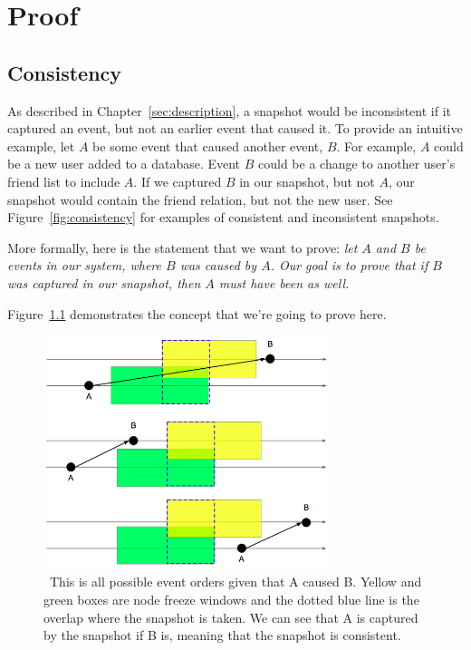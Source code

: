 \chapter{Proof}
\label{sec:proof}


\section{Consistency}

As described in Chapter~\ref{sec:description}, a snapshot would be
inconsistent if it captured an event, but not an earlier event that
caused it. To provide an intuitive example, let $A$ be some event that
caused another event, $B$.  For example, $A$ could be a new user added
to a database. Event $B$ could be a change to another user's friend list to
include $A$. If we captured $B$ in our snapshot, but not $A$, our
snapshot would contain the friend relation, but not the new user. See 
Figure~\ref{fig:consistency} for examples of consistent and inconsistent
snapshots.

More formally, here is the statement that we want to prove: {\em let $A$ and $B$ be events in our system, where $B$ was caused by
$A$. Our goal is to prove that if $B$ was captured in our snapshot, then $A$ must have been as well.}

Figure~\ref{fig:consistentoverlap} demonstrates the concept that we're going
to prove here.

\begin{figure}[!htbp]
  \centering
  \caption{~This is all possible event orders given that A caused B. Yellow and green boxes are node freeze windows and the dotted blue line is the overlap where the snapshot is taken. We can see that A is captured by the snapshot if B is, meaning that the snapshot is consistent.} 
  \label{fig:consistentoverlap}
  \includegraphics[width=0.75\textwidth]{consistentoverlap.png}
\end{figure}

